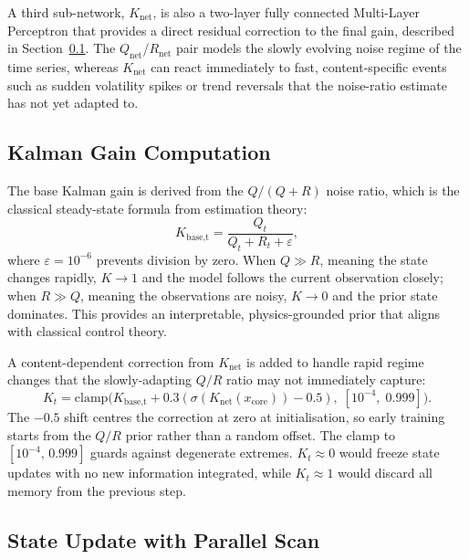 A third sub-network, $K_\text{net}$, is also a two-layer fully connected Multi-Layer Perceptron
that provides a direct residual correction to the final gain, described in
Section~\ref{sec:kalman_gain}.
The $Q_\text{net}$/$R_\text{net}$ pair models the slowly evolving noise
regime of the time series, whereas $K_\text{net}$ can react immediately to
fast, content-specific events such as sudden volatility spikes or trend
reversals that the noise-ratio estimate has not yet adapted to.

\subsection{Kalman Gain Computation}
\label{sec:kalman_gain}

The base Kalman gain is derived from the $Q/(Q+R)$ noise ratio, which is the
classical steady-state formula from estimation theory:
\begin{equation}
    K_\text{base,t} = \frac{Q_t}{Q_t + R_t + \varepsilon},
    \label{eq:K_base}
\end{equation}
where $\varepsilon = 10^{-6}$ prevents division by zero.
When $Q \gg R$, meaning the state changes rapidly, $K \to 1$ and the model follows the
current observation closely; when $R \gg Q$, meaning the observations are noisy, $K \to 0$
and the prior state dominates.
This provides an interpretable, physics-grounded prior that aligns with
classical control theory.

A content-dependent correction from $K_\text{net}$ is added to handle rapid
regime changes that the slowly-adapting $Q/R$ ratio may not immediately
capture:
\begin{equation}
    K_t = \mathrm{clamp}\bigl(K_\text{base,t} +
          0.3(\sigma(K_\text{net}(x_\text{core})) - 0.5),\;
          [10^{-4},\; 0.999]\bigr).
    \label{eq:K_final}
\end{equation}
The $-0.5$ shift centres the correction at zero at initialisation, so early
training starts from the $Q/R$ prior rather than a random offset.
The clamp to $[10^{-4},\, 0.999]$ guards against degenerate extremes.
$K_t \approx 0$ would freeze state updates with no new information integrated,
while $K_t \approx 1$ would discard all memory from the previous step.

\subsection{State Update with Parallel Scan}

